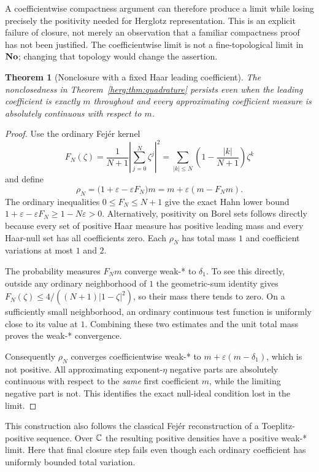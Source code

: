 \documentclass[11pt,letterpaper]{article}
\newtheorem{theorem}{Theorem}[section]
\theoremstyle{definition}
\newcommand{\eps}{\varepsilon}
\numberwithin{equation}{section}
\begin{document}
A coefficientwise compactness argument can therefore produce a limit while losing precisely the positivity needed for Herglotz representation. This is an explicit failure of closure, not merely an observation that a familiar compactness proof has not been justified. The coefficientwise limit is not a fine-topological limit in $\mathbf{No}$; changing that topology would change the assertion.

\begin{theorem}[Nonclosure with a fixed Haar leading coefficient]\label{herg:thm:fejer}
The nonclosedness in Theorem~\ref{herg:thm:quadrature} persists even when the leading coefficient is exactly $m$ throughout and every approximating coefficient measure is absolutely continuous with respect to $m$.
\end{theorem}
\begin{proof}
Use the ordinary Fej\'er kernel
\[
 F_N(\zeta)=\frac{1}{N+1}\left|\sum_{j=0}^N\zeta^j\right|^2
 =\sum_{|k|\le N}\left(1-\frac{|k|}{N+1}\right)\zeta^k
\]
and define
\[
 \rho_N=\bigl(1+\eps-\eps F_N\bigr)m
       =m+\eps(m-F_Nm).
\]
The ordinary inequalities $0\le F_N\le N+1$ give the exact Hahn lower bound $1+\eps-\eps F_N\ge1-N\eps>0$. Alternatively, positivity on Borel sets follows directly because every set of positive Haar measure has positive leading mass and every Haar-null set has all coefficients zero. Each $\rho_N$ has total mass $1$ and coefficient variations at most $1$ and $2$.

The probability measures $F_Nm$ converge weak-* to $\delta_1$. To see this directly, outside any ordinary neighborhood of $1$ the geometric-sum identity gives $F_N(\zeta)\le4/((N+1)|1-\zeta|^2)$, so their mass there tends to zero. On a sufficiently small neighborhood, an ordinary continuous test function is uniformly close to its value at $1$. Combining these two estimates and the unit total mass proves the weak-* convergence.

Consequently $\rho_N$ converges coefficientwise weak-* to $m+\eps(m-\delta_1)$, which is not positive. All approximating exponent-$\eta$ negative parts are absolutely continuous with respect to the \emph{same} first coefficient $m$, while the limiting negative part is not. This identifies the exact null-ideal condition lost in the limit.
\end{proof}

This construction also follows the classical Fej\'er reconstruction of a Toeplitz-positive sequence. Over $\mathbb C$ the resulting positive densities have a positive weak-* limit. Here that final closure step fails even though each ordinary coefficient has uniformly bounded total variation.
\end{document}
